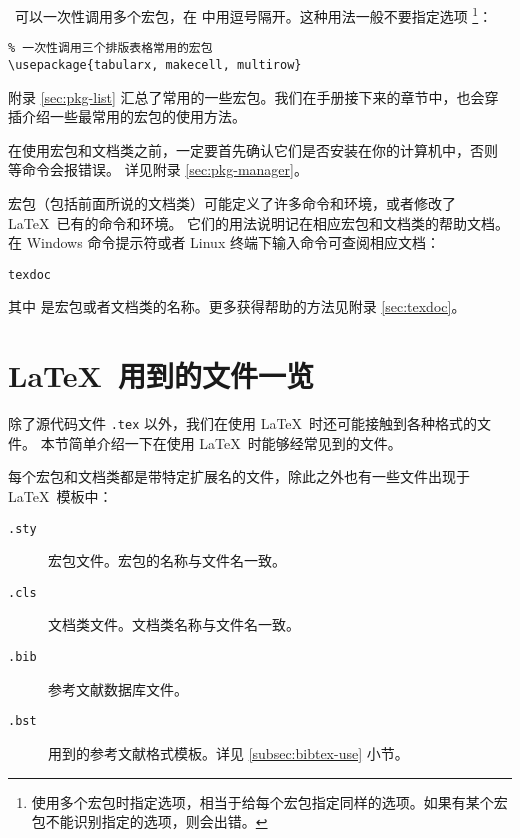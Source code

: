 ~可以一次性调用多个宏包，在  中用逗号隔开。这种用法一般不要指定选项%
\footnote{使用多个宏包时指定选项，相当于给每个宏包指定同样的选项。如果有某个宏包不能识别指定的选项，则会出错。}：
\begin{verbatim}
% 一次性调用三个排版表格常用的宏包
\usepackage{tabularx, makecell, multirow}
\end{verbatim}

附录 \ref{sec:pkg-list} 汇总了常用的一些宏包。我们在手册接下来的章节中，也会穿插介绍一些最常用的宏包的使用方法。

在使用宏包和文档类之前，一定要首先确认它们是否安装在你的计算机中，否则  等命令会报错误。
详见附录 \ref{sec:pkg-manager}。

宏包（包括前面所说的文档类）可能定义了许多命令和环境，或者修改了 \LaTeX\ 已有的命令和环境。
它们的用法说明记在相应宏包和文档类的帮助文档。在 Windows 命令提示符或者 Linux 终端下输入命令可查阅相应文档：
\begin{command}
\texttt{texdoc} 
\end{command}

其中  是宏包或者文档类的名称。更多获得帮助的方法见附录 \ref{sec:texdoc}。

\section{\LaTeX\ 用到的文件一览}\label{sec:latex-files}

除了源代码文件 \texttt{.tex} 以外，我们在使用 \LaTeX\ 时还可能接触到各种格式的文件。
本节简单介绍一下在使用 \LaTeX\ 时能够经常见到的文件。

每个宏包和文档类都是带特定扩展名的文件，除此之外也有一些文件出现于 \LaTeX\ 模板中：
\begin{description}
  \item[\texttt{.sty}] 宏包文件。宏包的名称与文件名一致。
  \item[\texttt{.cls}] 文档类文件。文档类名称与文件名一致。
  \item[\texttt{.bib}]  参考文献数据库文件。
  \item[\texttt{.bst}]  用到的参考文献格式模板。详见 \ref{subsec:bibtex-use} 小节。
\end{description}

